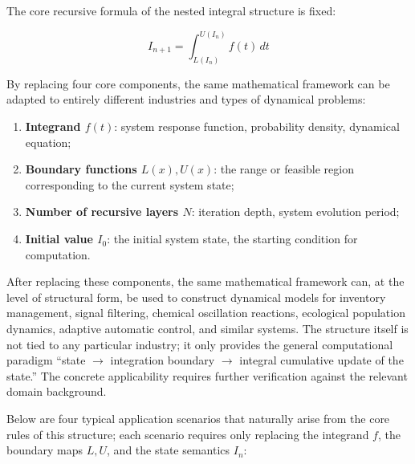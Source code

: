 \documentclass[11pt,a4paper]{amsart}
\begin{document}
The core recursive formula of the nested integral structure is fixed:

\begin{equation}
\label{eq:core-recursion}
I_{n+1} = \int_{L(I_n)}^{U(I_n)} f(t) \, dt
\end{equation}

By replacing four core components, the same mathematical framework can be adapted to entirely different industries and types of dynamical problems:

\begin{enumerate}
\item \textbf{Integrand $f(t)$}: system response function, probability density, dynamical equation;
\item \textbf{Boundary functions $L(x), U(x)$}: the range or feasible region corresponding to the current system state;
\item \textbf{Number of recursive layers $N$}: iteration depth, system evolution period;
\item \textbf{Initial value $I_0$}: the initial system state, the starting condition for computation.
\end{enumerate}

After replacing these components, the same mathematical framework can, at the level of structural form, be used to construct dynamical models for inventory management, signal filtering, chemical oscillation reactions, ecological population dynamics, adaptive automatic control, and similar systems. The structure itself is not tied to any particular industry; it only provides the general computational paradigm ``state $\to$ integration boundary $\to$ integral cumulative update of the state.'' The concrete applicability requires further verification against the relevant domain background.

Below are four typical application scenarios that naturally arise from the core rules of this structure; each scenario requires only replacing the integrand $f$, the boundary maps $L, U$, and the state semantics $I_n$:
\end{document}
